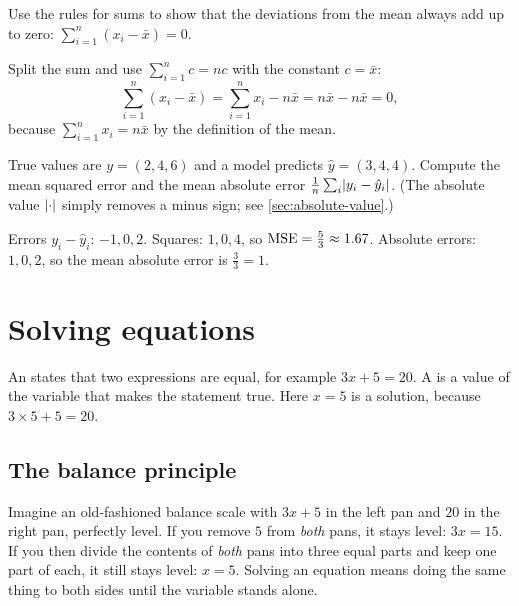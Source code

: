 \begin{exercise}
Use the rules for sums to show that the deviations from the mean always add up
to zero: $\sum_{i=1}^n (x_i - \bar x) = 0$.
\end{exercise}
\begin{solution}
Split the sum and use $\sum_{i=1}^n c = nc$ with the constant $c = \bar x$:
\[
  \sum_{i=1}^n (x_i - \bar x) = \sum_{i=1}^n x_i - n\bar x
  = n\bar x - n\bar x = 0,
\]
because $\sum_{i=1}^n x_i = n\bar x$ by the definition of the mean.
\end{solution}

\begin{exercise}
True values are $y = (2, 4, 6)$ and a model predicts $\hat y = (3, 4, 4)$.
Compute the mean squared error and the mean absolute error
$\tfrac1n\sum_i \lvert y_i - \hat y_i\rvert$. (The absolute value $\lvert\cdot\rvert$ simply
removes a minus sign; see \cref{sec:absolute-value}.)
\end{exercise}
\begin{solution}
Errors $y_i - \hat y_i$: $-1, 0, 2$. Squares: $1, 0, 4$, so
$\operatorname{MSE} = \tfrac53 \approx 1.67$. Absolute errors: $1, 0, 2$, so the mean
absolute error is $\tfrac33 = 1$.
\end{solution}

\section{Solving equations}\label{sec:equations}

An  states that two expressions are equal, for example
$3x + 5 = 20$. A  is a value of the
variable that makes the statement true. Here $x = 5$ is a solution, because
$3 \times 5 + 5 = 20$.

\subsection{The balance principle}

\begin{picturethis}
Imagine an old-fashioned balance scale with $3x + 5$ in the left pan and $20$
in the right pan, perfectly level. If you remove $5$ from \emph{both} pans, it
stays level: $3x = 15$. If you then divide the contents of \emph{both} pans
into three equal parts and keep one part of each, it still stays level:
$x = 5$. Solving an equation means doing the same thing to both sides until
the variable stands alone.
\end{picturethis}

